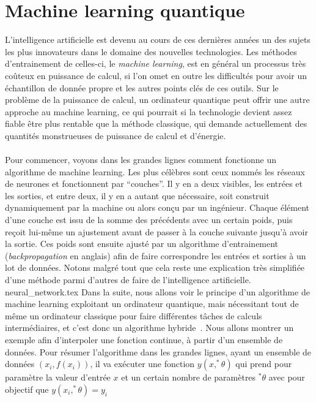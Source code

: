 \chapter{Machine learning quantique}\label{ch:machine-learning-quantique}

L'intelligence artificielle est devenu au cours de ces dernières années un des sujets
les plus innovateurs dans le domaine des nouvelles technologies.
Les méthodes d'entrainement de celles-ci, le \textit{machine learning}, est en général
un processus très coûteux en puissance de calcul, si l'on omet en outre les difficultés
pour avoir un échantillon de donnée propre et les autres points clés de ces outils.
Sur le problème de la puissance de calcul, un ordinateur quantique peut offrir une
autre approche au machine learning, ce qui pourrait si la technologie devient assez
fiable être plus rentable que la méthode classique, qui demande actuellement des
quantités monstrueuses de puissance de calcul et d'énergie.\\ \\
Pour commencer, voyons dans les grandes lignes comment fonctionne un algorithme de
machine learning.
Les plus célèbres sont ceux nommés les réseaux de neurones et fonctionnent par
``couches''.
Il y en a deux visibles, les entrées et les sorties, et entre deux, il y en a autant
que nécessaire, soit construit dynamiquement par la machine ou alors conçu par un
ingénieur.
Chaque élément d'une couche est issu de la somme des précédents avec un certain poids,
puis reçoit lui-même un ajustement avant de passer à la couche suivante jusqu'à avoir
la sortie.
Ces poids sont ensuite ajusté par un algorithme d'entrainement
(\textit{backpropagation} en anglais) afin de faire correspondre les entrées et sorties
à un lot de données.
Notons malgré tout que cela reste une explication très simplifiée d'une méthode parmi
d'autres de faire de l'intelligence artificielle.
{neural_network.tex}
Dans la suite, nous allons voir le principe d'un algorithme de machine learning exploitant
un ordinateur quantique, mais nécessitant tout de même un ordinateur classique pour
faire différentes tâches de calculs intermédiaires, et c'est donc un algorithme
hybride~\cite{qml-article}.
Nous allons montrer un exemple afin d'interpoler une fonction continue, à partir d'un
ensemble de données.
Pour résumer l'algorithme dans les grandes lignes, ayant un ensemble de données $(x_i, f(x_i))$,
il va exécuter une fonction $y(x, ^*\theta)$ qui prend pour paramètre la valeur d'entrée $x$
et un certain nombre de paramètres $^*\theta$ avec pour objectif que $y(x_i, ^*\theta) = y_i$
